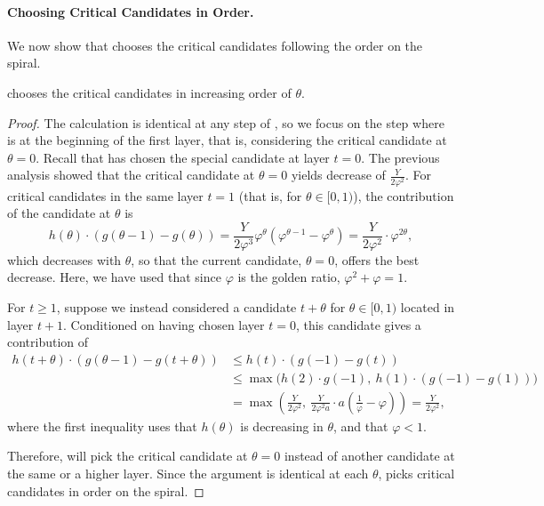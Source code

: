 \paragraph{Choosing Critical Candidates in Order.} We now show that \g{} chooses the critical candidates following the order on the spiral.
\begin{lemma}
\label{lem:greedyopt2}
\g{} chooses the critical candidates in increasing order of $\theta$.
\end{lemma}
\begin{proof}
The calculation is identical at any step of \g{}, so we focus on the step where \g{} is at the beginning of the first layer, that is, considering the critical candidate at $\theta = 0$. Recall that \g{} has chosen the special candidate at layer $t = 0$. The previous analysis showed that the critical candidate at $\theta = 0$ yields decrease of $\frac{Y}{2 \varphi^2}$. For critical candidates in the same layer $t = 1$ (that is, for $\theta \in [0, 1)$), the contribution of the candidate at $\theta$ is
\[
h(\theta) \cdot (g(\theta-1) - g(\theta)) = \frac{Y}{2\varphi^3} \varphi^{\theta} \left(\varphi^{\theta - 1} - \varphi^{\theta}\right) = \frac{Y}{2\varphi^2} \cdot \varphi^{2\theta},
\]
which decreases with $\theta$, so that the current candidate, $\theta = 0$, offers the best decrease. Here, we have used that since $\varphi$ is the golden ratio, $\varphi^2 + \varphi = 1$.

For $t \ge 1$, suppose we instead considered a candidate $t +\theta$ for $\theta \in [0,1)$ located in layer $t+1$. Conditioned on having chosen layer $t = 0$, this candidate gives a contribution of
\begin{align*}
h(t + \theta) \cdot (g(\theta-1) - g(t + \theta)) &\leq h(t) \cdot (g(-1) - g(t))\\
&\leq \max\big(h(2) \cdot g(-1), \ h(1) \cdot (g(-1) - g(1))\big)\\
&= \max\left(\frac{Y}{2\varphi^2}, \ \frac{Y}{2\varphi^2a} \cdot a\left(\frac{1}{\varphi} - \varphi\right)\right) = \frac{Y}{2\varphi^2},
\end{align*}
where the first inequality uses that $h(\theta)$ is decreasing in $\theta$, and that $\varphi < 1$.

Therefore, \g{} will pick the critical candidate at $\theta = 0$ instead of another candidate at the same or a higher layer. Since the argument is identical at each $\theta$, \g{} picks critical candidates in order on the spiral.
\end{proof}

